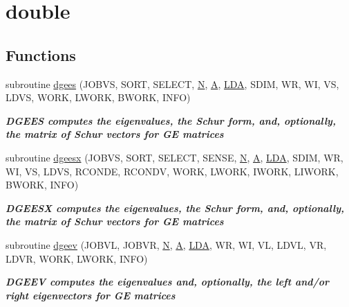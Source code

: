\hypertarget{group__doubleGEeigen}{}\section{double}
\label{group__doubleGEeigen}
\subsection*{Functions}
\begin{DoxyCompactItemize}
\item 
subroutine \hyperlink{group__doubleGEeigen_ga2233e8611b7b529422497036b284b438}{dgees} (J\+O\+B\+V\+S, S\+O\+R\+T, S\+E\+L\+E\+C\+T, \hyperlink{polmisc_8c_a0240ac851181b84ac374872dc5434ee4}{N}, \hyperlink{classA}{A}, \hyperlink{example__user_8c_ae946da542ce0db94dced19b2ecefd1aa}{L\+D\+A}, S\+D\+I\+M, W\+R, W\+I, V\+S, L\+D\+V\+S, W\+O\+R\+K, L\+W\+O\+R\+K, B\+W\+O\+R\+K, I\+N\+F\+O)
\begin{DoxyCompactList}\small\item\em {\bfseries  D\+G\+E\+E\+S computes the eigenvalues, the Schur form, and, optionally, the matrix of Schur vectors for G\+E matrices} \end{DoxyCompactList}\item 
subroutine \hyperlink{group__doubleGEeigen_ga745081b04dc6f1b5a93a5d8b31aec915}{dgeesx} (J\+O\+B\+V\+S, S\+O\+R\+T, S\+E\+L\+E\+C\+T, S\+E\+N\+S\+E, \hyperlink{polmisc_8c_a0240ac851181b84ac374872dc5434ee4}{N}, \hyperlink{classA}{A}, \hyperlink{example__user_8c_ae946da542ce0db94dced19b2ecefd1aa}{L\+D\+A}, S\+D\+I\+M, W\+R, W\+I, V\+S, L\+D\+V\+S, R\+C\+O\+N\+D\+E, R\+C\+O\+N\+D\+V, W\+O\+R\+K, L\+W\+O\+R\+K, I\+W\+O\+R\+K, L\+I\+W\+O\+R\+K, B\+W\+O\+R\+K, I\+N\+F\+O)
\begin{DoxyCompactList}\small\item\em {\bfseries  D\+G\+E\+E\+S\+X computes the eigenvalues, the Schur form, and, optionally, the matrix of Schur vectors for G\+E matrices} \end{DoxyCompactList}\item 
subroutine \hyperlink{group__doubleGEeigen_ga66e19253344358f5dee1e60502b9e96f}{dgeev} (J\+O\+B\+V\+L, J\+O\+B\+V\+R, \hyperlink{polmisc_8c_a0240ac851181b84ac374872dc5434ee4}{N}, \hyperlink{classA}{A}, \hyperlink{example__user_8c_ae946da542ce0db94dced19b2ecefd1aa}{L\+D\+A}, W\+R, W\+I, V\+L, L\+D\+V\+L, V\+R, L\+D\+V\+R, W\+O\+R\+K, L\+W\+O\+R\+K, I\+N\+F\+O)
\begin{DoxyCompactList}\small\item\em {\bfseries  D\+G\+E\+E\+V computes the eigenvalues and, optionally, the left and/or right eigenvectors for G\+E matrices} \end{DoxyCompactList}\item 

\end{DoxyCompactItemize}
